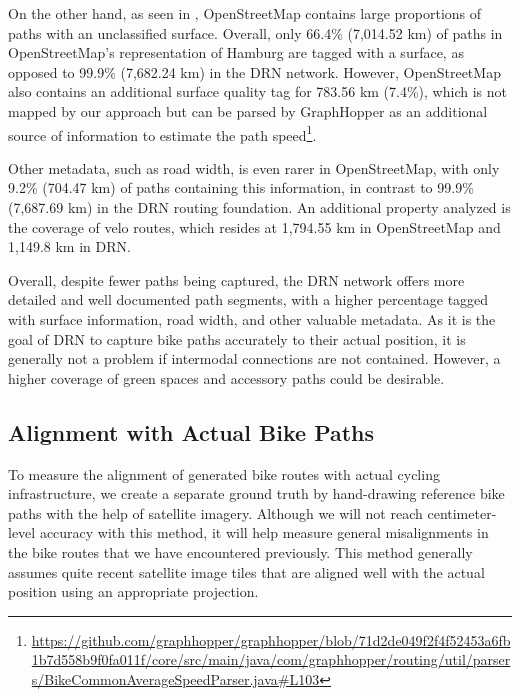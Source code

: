 On the other hand, as seen in , OpenStreetMap contains large proportions of paths with an unclassified surface. Overall, only 66.4\% (7,014.52 km) of paths in OpenStreetMap's representation of Hamburg are tagged with a surface, as opposed to 99.9\% (7,682.24 km) in the DRN network. However, OpenStreetMap also contains an additional surface quality tag for 783.56 km (7.4\%), which is not mapped by our approach but can be parsed by GraphHopper as an additional source of information to estimate the path speed\footnote{\url{https://github.com/graphhopper/graphhopper/blob/71d2de049f2f4f52453a6fb1b7d558b9f0fa011f/core/src/main/java/com/graphhopper/routing/util/parsers/BikeCommonAverageSpeedParser.java\#L103}}. 

Other metadata, such as road width, is even rarer in OpenStreetMap, with only 9.2\% (704.47 km) of paths containing this information, in contrast to 99.9\% (7,687.69 km) in the DRN routing foundation. An additional property analyzed is the coverage of velo routes, which resides at 1,794.55 km in OpenStreetMap and 1,149.8 km in DRN.

Overall, despite fewer paths being captured, the DRN network offers more detailed and well documented path segments, with a higher percentage tagged with surface information, road width, and other valuable metadata. As it is the goal of DRN to capture bike paths accurately to their actual position, it is generally not a problem if intermodal connections are not contained. However, a higher coverage of green spaces and accessory paths could be desirable. 

\subsection{Alignment with Actual Bike Paths}

To measure the alignment of generated bike routes with actual cycling infrastructure, we create a separate ground truth by hand-drawing reference bike paths with the help of satellite imagery. Although we will not reach centimeter-level accuracy with this method, it will help measure general misalignments in the bike routes that we have encountered previously. This method generally assumes quite recent satellite image tiles that are aligned well with the actual position using an appropriate projection.

